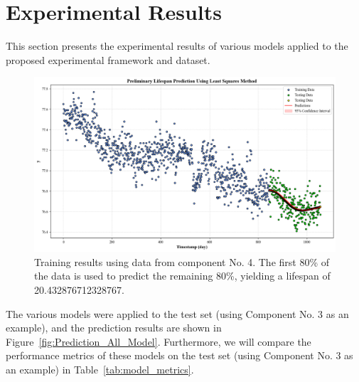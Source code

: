 \section{Experimental Results}
\label{sec:Experimental Results}
This section presents the experimental results of various models applied to the proposed experimental framework and dataset.

\begin{figure}[H]
	\centering
	\includegraphics[width=\linewidth]{figures/sourceModelTraining_Prediction}
	\caption{Training results using data from component No. 4. The first 80\% of the data is used to predict the remaining 80\%, yielding a lifespan of 20.432876712328767.}

	\label{fig:sourceModelTraining_Prediction}
\end{figure}

The various models were applied to the test set (using Component No. 3 as an example), and the prediction results are shown in Figure~\ref{fig:Prediction_All_Model}. Furthermore, we will compare the performance metrics of these models on the test set (using Component No. 3 as an example) in Table~\ref{tab:model_metrics}.

